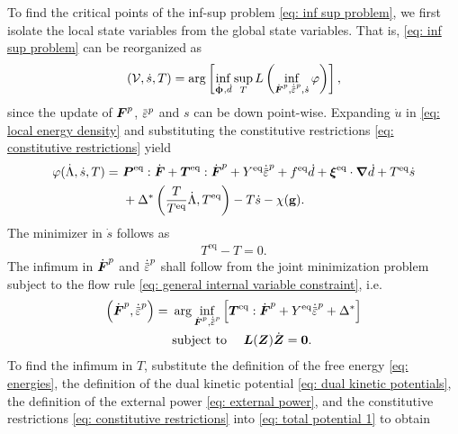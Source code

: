 To find the critical points of the inf-sup problem \eqref{eq: inf sup problem}, we first isolate the local state variables from the global state variables. That is, \eqref{eq: inf sup problem} can be reorganized as
\begin{align}
    \left( \mathcal{V}, \dot{s}, T \right) = \arg \left[ \inf_{\dot{\bs{\upphi}}, \dot{d}} \sup_T L\left( \inf_{\dot{\defgrad}^p, \epdot, \dot{s}} \varphi \right) \right],
\end{align}
since the update of $\boldsymbol{F}^p$, $\ep$ and $s$ can be down point-wise. Expanding $\dot{u}$ in \eqref{eq: local energy density} and substituting the constitutive restrictions \eqref{eq: constitutive restrictions} yield
\begin{equation}
\begin{aligned}
    \varphi(\dot{\Lambda}, \dot{s}, T) =&\ \bfP^\text{eq}:\dot{\defgrad} + \bfT^\text{eq}:\dot{\defgrad}^p + Y^\text{eq}\epdot + f^\text{eq}\dot{d} + \bs{\xi}^\text{eq}\cdot\grad\dot{d} + T^\text{eq}\dot{s} \\
    &\ + \Delta^*\left( \dfrac{T}{T^\text{eq}}\dot{\Lambda}, T^\text{eq} \right) - T\dot{s} - \chi(\btg).
\end{aligned}
\end{equation}
The minimizer in $\dot{s}$ follows as
\begin{align}
    T^\text{eq} - T = 0.
\end{align}
The infimum in $\dot{\boldsymbol{F}}^p$ and $\epdot$ shall follow from the joint minimization problem subject to the flow rule \eqref{eq: general internal variable constraint}, i.e.
\begin{equation}
\begin{aligned}
    \left( \dot{\defgrad}^p, \epdot \right) = &\ \arg\inf_{\dot{\defgrad}^p, \epdot} \left[ \bfT^\text{eq}:\dot{\defgrad}^p + Y^\text{eq}\epdot + \Delta^* \right] \\
    &\ \text{subject to }\quad \bfL(\bfZ)\dot{\bfZ} = \bs{0}.
\end{aligned}
\end{equation}
To find the infimum in $T$, substitute the definition of the free energy \eqref{eq: energies}, the definition of the dual kinetic potential \eqref{eq: dual kinetic potentials}, the definition of the external power \eqref{eq: external power}, and the constitutive restrictions \eqref{eq: constitutive restrictions} into \eqref{eq: total potential 1} to obtain
